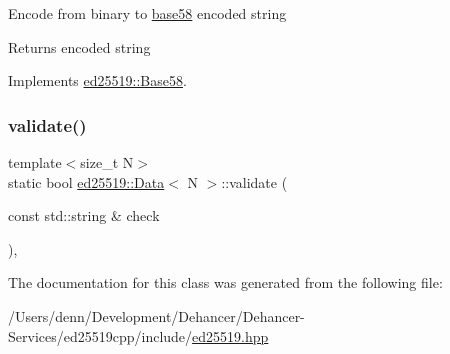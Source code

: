Encode from binary to \mbox{\hyperlink{namespaceed25519_1_1base58}{base58}} encoded string \begin{DoxyReturn}{Returns}
encoded string 
\end{DoxyReturn}


Implements \mbox{\hyperlink{classed25519_1_1_base58_a1b52a018a5215e2dcf2aa388b0fe06bf}{ed25519\+::\+Base58}}.

\mbox{\label{classed25519_1_1_data_a02609da44dcd8f0fa5812ecca0b84d21}} 
\subsubsection{\texorpdfstring{validate()}{validate()}}
{\footnotesize\ttfamily template$<$size\+\_\+t N$>$ \\
static bool \mbox{\hyperlink{classed25519_1_1_data}{ed25519\+::\+Data}}$<$ N $>$\+::validate (\begin{DoxyParamCaption}\item[{const std\+::string \&}]{check }\end{DoxyParamCaption})\hspace{0.3cm}{\ttfamily [inline]}, {\ttfamily [static]}}



The documentation for this class was generated from the following file\+:\begin{DoxyCompactItemize}
\item 
/\+Users/denn/\+Development/\+Dehancer/\+Dehancer-\/\+Services/ed25519cpp/include/\mbox{\hyperlink{ed25519_8hpp}{ed25519.\+hpp}}\end{DoxyCompactItemize}
